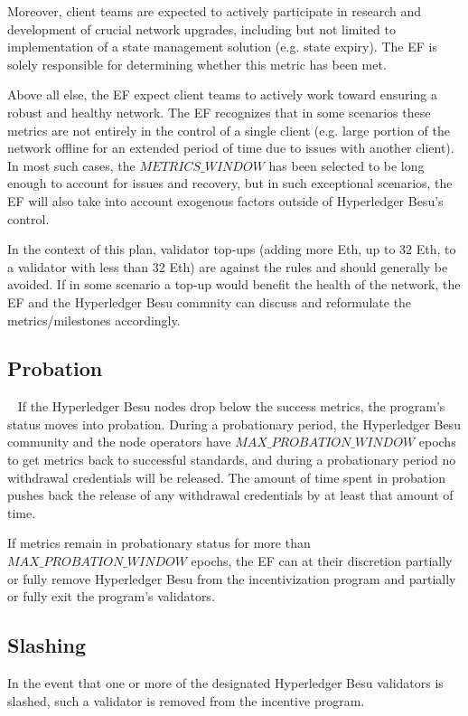 Moreover, client teams are expected to actively participate in research and development of crucial network upgrades, including but not limited to implementation of a state management solution (e.g. state expiry). The EF is solely responsible for determining whether this metric has been met.

Above all else, the EF expect client teams to actively work toward ensuring a robust and healthy network. The EF recognizes that in some scenarios these metrics are not entirely in the control of a single client (e.g. large portion of the network offline for an extended period of time due to issues with another client). In most such cases, the $METRICS\_WINDOW$ has been selected to be long enough to account for issues and recovery, but in such exceptional scenarios, the EF will also take into account exogenous factors outside of Hyperledger Besu’s control.

In the context of this plan, validator top-ups (adding more Eth, up to 32 Eth, to a validator with less than 32 Eth) are against the rules and should generally be avoided. If in some scenario a top-up would benefit the health of the network, the EF and the Hyperledger Besu commnity can discuss and reformulate the metrics/milestones accordingly.

\subsection{Probation}~\label{sec:Probation}
If the Hyperledger Besu nodes drop below the success metrics, the program's status moves into probation. During a probationary period, the Hyperledger Besu community and the node operators have $MAX\_PROBATION\_WINDOW$ epochs to get metrics back to successful standards, and during a probationary period no withdrawal credentials will be released. The amount of time spent in probation pushes back the release of any withdrawal credentials by at least that amount of time.

If metrics remain in probationary status for more than $MAX\_PROBATION\_WINDOW$ epochs, the EF can at their discretion partially or fully remove Hyperledger Besu from the incentivization program and partially or fully exit the program’s validators.

\subsection{Slashing}
In the event that one or more of the designated Hyperledger Besu validators is slashed, such a validator is removed from the incentive program.

